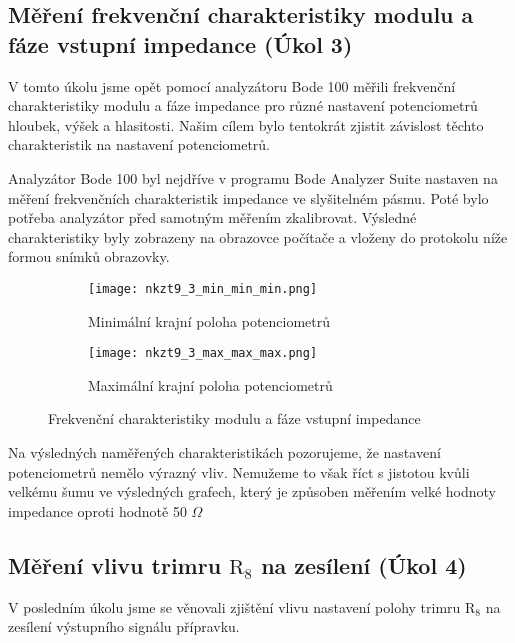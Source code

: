 \documentclass[a4paper, czech]{article}
\begin{document}
\subsection{Měření frekvenční charakteristiky modulu a fáze vstupní impedance (Úkol 3)}

V tomto úkolu jsme opět pomocí analyzátoru Bode 100 měřili frekvenční charakteristiky
modulu a fáze impedance pro různé nastavení potenciometrů hloubek, výšek a hlasitosti.
Našim cílem bylo tentokrát zjistit závislost těchto charakteristik na nastavení potenciometrů.

Analyzátor Bode 100 byl nejdříve v programu Bode Analyzer Suite nastaven na měření
frekvenčních charakteristik impedance ve slyšitelném pásmu.
Poté bylo potřeba analyzátor před samotným měřením zkalibrovat.
Výsledné charakteristiky byly zobrazeny na obrazovce počítače a vloženy do protokolu
níže formou snímků obrazovky.

\begin{figure}[H]
    \centering
    \begin{subfigure}{0.49\textwidth}
        \texttt{[image: nkzt9\_3\_min\_min\_min.png]}
        \caption{Minimální krajní poloha potenciometrů}
    \end{subfigure}
    \hfill
    \begin{subfigure}{0.49\textwidth}
        \texttt{[image: nkzt9\_3\_max\_max\_max.png]}
        \caption{Maximální krajní poloha potenciometrů}
    \end{subfigure}
    \caption{Frekvenční charakteristiky modulu a fáze vstupní impedance} 
\end{figure}

Na výsledných naměřených charakteristikách pozorujeme, že nastavení potenciometrů nemělo výrazný vliv.
Nemužeme to však říct s jistotou kvůli velkému šumu ve výsledných grafech, který je způsoben měřením velké hodnoty impedance oproti hodnotě 50 \(\Omega\)

\subsection{Měření vlivu trimru $\text{R}_8$ na zesílení (Úkol 4)}

V posledním úkolu jsme se věnovali zjištění vlivu nastavení polohy trimru $\text{R}_8$ na zesílení
výstupního signálu přípravku.
\end{document}
